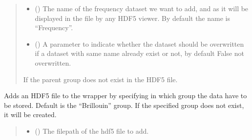 \documentclass[letterpaper,10pt,english]{sphinxmanual}
\begin{document}
\begin{fulllineitems}
\begin{fulllineitems}
\begin{quote}
\begin{description}
\begin{itemize}
\item {} 
\sphinxAtStartPar
{} (\sphinxstyleliteralemphasis{\sphinxupquote{, }}) \textendash{} The name of the frequency dataset we want to add, and as it will be displayed in the file by any HDF5 viewer. By default the name is “Frequency”.

\item {} 
\sphinxAtStartPar
{} (\sphinxstyleliteralemphasis{\sphinxupquote{, }}) \textendash{} A parameter to indicate whether the dataset should be overwritten if a dataset with same name already exist or not, by default False \sphinxhyphen{} not overwritten.

\end{itemize}

\sphinxAtStartPar
{\hyperref[\detokenize{source/_autosummary/HDF5_BLS.errors:HDF5_BLS.errors.WrapperError_StructureError}]{}} \textendash{} If the parent group does not exist in the HDF5 file.

\end{description}\end{quote}

\end{fulllineitems}


\begin{fulllineitems}
\label{\detokenize{source/_autosummary/HDF5_BLS.Wrapper:HDF5_BLS.Wrapper.add_hdf5}}
\pysigstartsignatures
\pysiglinewithargsret
{}
{\sphinxparamcomma {}\sphinxparamcomma {}}
{}
\pysigstopsignatures
\sphinxAtStartPar
Adds an HDF5 file to the wrapper by specifying in which group the data have to be stored. Default is the “Brillouin” group. If the specified group does not exist, it will be created.
\begin{quote}\begin{description}
\begin{itemize}
\item {} 
\sphinxAtStartPar
{} () \textendash{} The filepath of the hdf5 file to add.


\end{itemize}
\end{description}
\end{quote}
\end{fulllineitems}
\end{fulllineitems}
\end{document}
